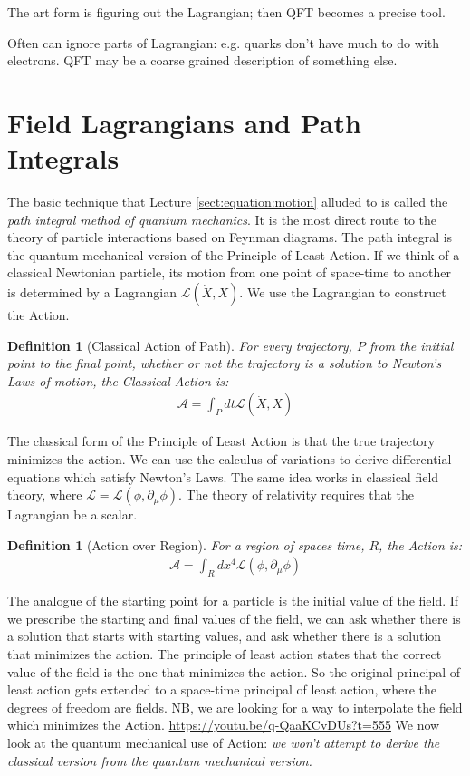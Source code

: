 \documentclass[]{article}
\newtheorem{defn}[thm]{Definition}
\begin{document}
The art form is figuring out the Lagrangian; then QFT becomes a precise tool.

Often can ignore parts of Lagrangian: e.g. quarks don't have much to do with electrons. QFT may be a coarse grained description of something else.
 

\section{Field Lagrangians and Path Integrals}

The basic technique that Lecture \ref{sect:equation:motion} alluded to is called the \emph{path integral method of quantum mechanics}. It is the most direct route to the theory of particle interactions based on Feynman diagrams. The path integral is the quantum mechanical version of the Principle of Least Action\cite{susskind2013quantum}. If we think of a classical Newtonian particle, its motion from one point of space-time to another is determined by a Lagrangian $\mathcal{L}(\dot{X},X)$. We use the Lagrangian to construct the Action. 

\begin{defn}[Classical Action of Path]
	For every trajectory, $P$ from the initial point to the final point, whether or not the trajectory is a solution to Newton's Laws of motion,  the Classical Action is: 
	\begin{align*}
		\mathcal{A}=\int_P dt \mathcal{L}(\dot{X},X)
	\end{align*}
\end{defn}


The classical form of the Principle of Least Action is that the true trajectory minimizes the action. We can use the calculus of variations to derive differential equations which satisfy Newton's Laws. The same idea works in classical field theory, where $\mathcal{L}=\mathcal{L}(\phi,\partial_\mu\phi)$. The theory of relativity requires that the Lagrangian be a scalar\cite{susskind2017special}.

\begin{defn}[Action over Region]
	For a region of spaces time, $R$,  the Action is: 
	\begin{align*}
		\mathcal{A}=\int_R dx^4 \mathcal{L}(\phi,\partial_\mu\phi)
	\end{align*}
\end{defn}

The analogue of the starting point for a particle is the initial value of the field. If we prescribe the starting and final values of the field, we can ask whether there is a solution that starts with starting values, and ask whether there is a solution that minimizes the action. The principle of least action states that the correct value of the field is the one that minimizes the action. So the original principal of least action gets extended to a space-time principal of least action, where the degrees of freedom are fields. NB, we are looking for a way to interpolate the field which minimizes the Action.
\url{https://youtu.be/q-QaaKCvDUs?t=555}
We now look at the quantum mechanical use of Action: \emph{we won't attempt to derive the classical version from the quantum mechanical version.}
\end{document}
